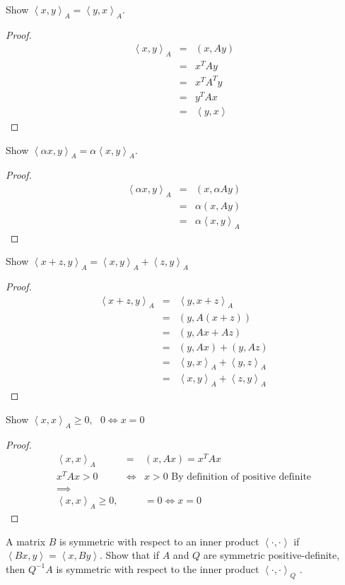 \documentclass{article}
\newcommand{\ea}[1]{\begin{eqnarray*}#1\end{eqnarray*}}
\newcommand{\inv}[1]{#1^{-1}}
\newcommand{\inner}[1]{\left\langle {#1} \right\rangle}
\begin{document}
Show $\inner{x,y}_A = \inner{y,x}_A$.
\begin{proof}
	\ea{
		\inner{x,y}_A &=& (x,Ay) \\
				&=& x^TAy \\
				&=& x^TA^Ty \\
				&=& y^TAx \\
				&=& \inner{y,x}
	}
\end{proof} 
Show $\inner{\alpha x, y}_A = \alpha\inner{x,y}_A$.
\begin{proof}
	\ea{
		\inner{\alpha x,y}_A &=& (x, \alpha Ay) \\
			&=& \alpha(x,Ay) \\
			&=& \alpha\inner{x,y}_A
	}
\end{proof}
Show $\inner{x+z,y}_A = \inner{x,y}_A + \inner{z,y}_A$
\begin{proof}
	\ea{
		\inner{x+z,y}_A &=& \inner{y,x+z}_A\\
			&=& (y, A(x+z))\\
			&=& (y, Ax+Az)\\
			&=& (y,Ax) + (y,Az) \\
			&=& \inner{y,x}_A + \inner{y,z}_A \\
			&=& \inner{x,y}_A + \inner{z,y}_A
	}
\end{proof}
Show $\inner{x,x}_A \ge 0,\textrm{  }0 \iff x=0$
\begin{proof}
\ea{
	\inner{x,x}_A &=& (x, Ax) = x^TAx \\
	x^TAx > 0 &\iff& x>0  \textrm{    By definition of positive definite}\\
	\implies \\
	\inner{x,x}_A \ge 0, && = 0 \iff x=0
}
\end{proof}
 A matrix $B$ is symmetric with respect to an inner product 
$\inner{·, ·}$ if  $\inner{Bx, y} = \inner{x, By}$. Show that if $A$ and $Q$ are 
symmetric positive-definite, then $\inv{Q}A$ is symmetric with respect to the 
inner product $\inner{·, ·}_Q$ .
\end{document}
